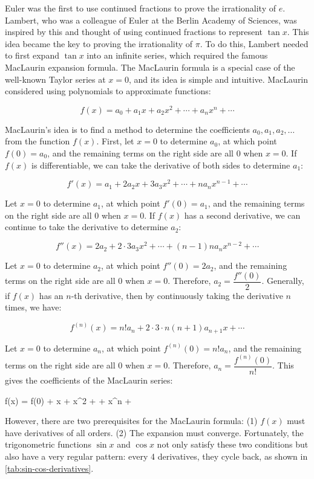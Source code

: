 \documentclass[b5paper]{article}
\begin{document}
Euler was the first to use continued fractions to prove the irrationality of $e$. Lambert, who was a colleague of Euler at the Berlin Academy of Sciences, was inspired by this and thought of using continued fractions to represent $\tan x$. This idea became the key to proving the irrationality of $\pi$. To do this, Lambert needed to first expand $\tan x$ into an infinite series, which required the famous MacLaurin expansion formula. The MacLaurin formula is a special case of the well-known Taylor series at $x = 0$, and its idea is simple and intuitive. MacLaurin considered using polynomials to approximate functions:

\[
f(x) = a_0 + a_1 x + a_2 x^2 + \dotsb + a_n x^n + \dotsb
\]

MacLaurin's idea is to find a method to determine the coefficients $a_0, a_1, a_2, \dots$ from the function $f(x)$. First, let $x = 0$ to determine $a_0$, at which point $f(0) = a_0$, and the remaining terms on the right side are all 0 when $x = 0$. If $f(x)$ is differentiable, we can take the derivative of both sides to determine $a_1$:

\[
f'(x) = a_1 + 2a_2 x + 3 a_3 x^2 + \dotsb + n a_n x^{n-1} + \dotsb
\]

Let $x = 0$ to determine $a_1$, at which point $f'(0) = a_1$, and the remaining terms on the right side are all 0 when $x = 0$. If $f(x)$ has a second derivative, we can continue to take the derivative to determine $a_2$:

\[
f''(x) = 2a_2 + 2 \cdot 3 a_3 x^2 + \dotsb + (n-1)n a_n x^{n-2} + \dotsb
\]

Let $x = 0$ to determine $a_2$, at which point $f''(0) = 2a_2$, and the remaining terms on the right side are all 0 when $x = 0$. Therefore, $a_2 = \dfrac{f''(0)}{2}$. Generally, if $f(x)$ has an $n$-th derivative, then by continuously taking the derivative $n$ times, we have:

\[
f^{(n)}(x) = n!a_n + 2 \cdot 3 \cdot n (n+1) a_{n+1} x + \dotsb
\]

Let $x = 0$ to determine $a_n$, at which point $f^{(n)}(0) = n!a_n$, and the remaining terms on the right side are all 0 when $x = 0$. Therefore, $a_n = \dfrac{f^{(n)}(0)}{n!}$. This gives the coefficients of the MacLaurin series:

\be \label{eq:maclaurin}
f(x) = f(0) + x + x^2 + \dotsb + x^n + \dotsb
\ee

However, there are two prerequisites for the MacLaurin formula: (1) $f(x)$ must have derivatives of all orders. (2) The expansion must converge. Fortunately, the trigonometric functions $\sin x$ and $\cos x$ not only satisfy these two conditions but also have a very regular pattern: every 4 derivatives, they cycle back, as shown in \cref{tab:sin-cos-derivatives}.
\end{document}
